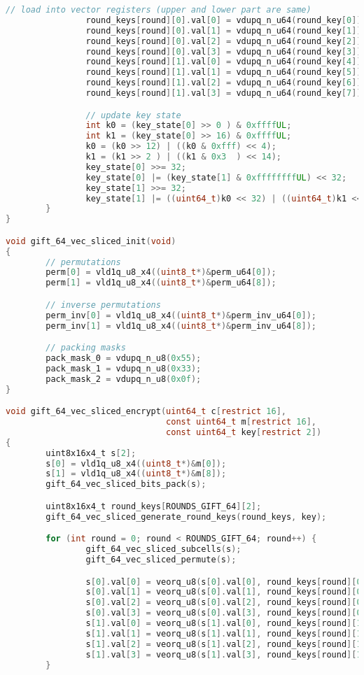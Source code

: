 \begin{lstlisting}[language=c, caption={gift\_vec\_sliced.c}]
                // load into vector registers (upper and lower part are same)
                round_keys[round][0].val[0] = vdupq_n_u64(round_key[0]);
                round_keys[round][0].val[1] = vdupq_n_u64(round_key[1]);
                round_keys[round][0].val[2] = vdupq_n_u64(round_key[2]);
                round_keys[round][0].val[3] = vdupq_n_u64(round_key[3]);
                round_keys[round][1].val[0] = vdupq_n_u64(round_key[4]);
                round_keys[round][1].val[1] = vdupq_n_u64(round_key[5]);
                round_keys[round][1].val[2] = vdupq_n_u64(round_key[6]);
                round_keys[round][1].val[3] = vdupq_n_u64(round_key[7]);

                // update key state
                int k0 = (key_state[0] >> 0 ) & 0xffffUL;
                int k1 = (key_state[0] >> 16) & 0xffffUL;
                k0 = (k0 >> 12) | ((k0 & 0xfff) << 4);
                k1 = (k1 >> 2 ) | ((k1 & 0x3  ) << 14);
                key_state[0] >>= 32;
                key_state[0] |= (key_state[1] & 0xffffffffUL) << 32;
                key_state[1] >>= 32;
                key_state[1] |= ((uint64_t)k0 << 32) | ((uint64_t)k1 << 48);
        }
}

void gift_64_vec_sliced_init(void)
{
        // permutations
        perm[0] = vld1q_u8_x4((uint8_t*)&perm_u64[0]);
        perm[1] = vld1q_u8_x4((uint8_t*)&perm_u64[8]);

        // inverse permutations
        perm_inv[0] = vld1q_u8_x4((uint8_t*)&perm_inv_u64[0]);
        perm_inv[1] = vld1q_u8_x4((uint8_t*)&perm_inv_u64[8]);

        // packing masks
        pack_mask_0 = vdupq_n_u8(0x55);
        pack_mask_1 = vdupq_n_u8(0x33);
        pack_mask_2 = vdupq_n_u8(0x0f);
}

void gift_64_vec_sliced_encrypt(uint64_t c[restrict 16],
                                const uint64_t m[restrict 16],
                                const uint64_t key[restrict 2])
{
        uint8x16x4_t s[2];
        s[0] = vld1q_u8_x4((uint8_t*)&m[0]);
        s[1] = vld1q_u8_x4((uint8_t*)&m[8]);
        gift_64_vec_sliced_bits_pack(s);

        uint8x16x4_t round_keys[ROUNDS_GIFT_64][2];
        gift_64_vec_sliced_generate_round_keys(round_keys, key);

        for (int round = 0; round < ROUNDS_GIFT_64; round++) {
                gift_64_vec_sliced_subcells(s);
                gift_64_vec_sliced_permute(s);

                s[0].val[0] = veorq_u8(s[0].val[0], round_keys[round][0].val[0]);
                s[0].val[1] = veorq_u8(s[0].val[1], round_keys[round][0].val[1]);
                s[0].val[2] = veorq_u8(s[0].val[2], round_keys[round][0].val[2]);
                s[0].val[3] = veorq_u8(s[0].val[3], round_keys[round][0].val[3]);
                s[1].val[0] = veorq_u8(s[1].val[0], round_keys[round][1].val[0]);
                s[1].val[1] = veorq_u8(s[1].val[1], round_keys[round][1].val[1]);
                s[1].val[2] = veorq_u8(s[1].val[2], round_keys[round][1].val[2]);
                s[1].val[3] = veorq_u8(s[1].val[3], round_keys[round][1].val[3]);
        }


\end{lstlisting}
